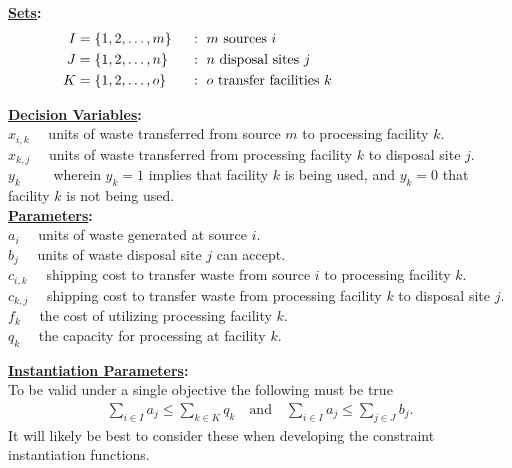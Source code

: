 \documentclass[12pt]{amsart}
\begin{document}
\textbf{\underline{Sets}:} 
\begin{alignat*}{2}
	I &= \{1,2,\ldots,m\}\ & &:\ m \text{ sources } i \hspace{30ex} \\
	J &= \{1,2,\ldots,n\}\ & &:\ n \text{ disposal sites } j  \\
	K &= \{1,2,\ldots,o\}\ & &:\ o \text{ transfer facilities } k 
\end{alignat*} 

\textbf{\underline{Decision Variables}:} \\ 

\noindent
\(x_{i,k}\quad\) units of waste transferred from source \(m\) to processing facility \(k\). \\
\(x_{k,j}\quad\) units of waste transferred from processing facility \(k\) to disposal site \(j\). \\
\(y_k\qquad\!\) wherein \(y_k=1\) implies that facility \(k\) is being used,
and \(y_k=0\) that facility \(k\) is not being used. \\

\textbf{\underline{Parameters}:} \\

\noindent
\(a_i\quad\) units of waste generated at source \(i\). \\
\(b_j\quad\) units of waste disposal site \(j\) can accept. \\
\(c_{i,k}\quad\) shipping cost to transfer waste from source \(i\) to processing facility \(k\). \\
\(c_{k,j}\quad\) shipping cost to transfer waste from processing facility \(k\) to disposal site \(j\). \\
\(f_k\quad\) the cost of utilizing processing facility \(k\). \\
\(q_k\quad\) the capacity for processing at facility \(k\). \\

\clearpage

\textbf{\underline{Instantiation Parameters}:} \\

\noindent
To be valid under a single objective the following must be true
\begin{align*}
	\sum_{i\in I}a_j \leq \sum_{k\in K}q_k \quad\text{and}\quad
	\sum_{i\in I}a_j \leq \sum_{j\in J}b_j .
\end{align*}
It will likely be best to consider these when developing the
constraint instantiation functions. \\
\end{document}
